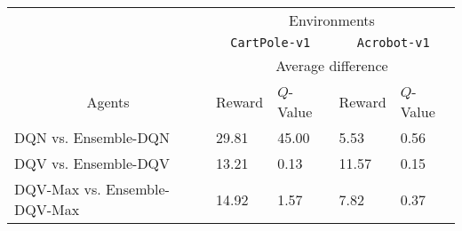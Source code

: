 \documentclass{article}
\begin{document}
\begin{table}[]
\begin{tabular}{@{}c|llll@{}}
\toprule
                                                   & \multicolumn{4}{c}{Environments}                                                                                                                                                         \\
                                                   & \multicolumn{2}{c}{\texttt{CartPole-v1}}                                        & \multicolumn{2}{c}{\texttt{Acrobot-v1}}                                                                \\ \cmidrule(l){2-5}
                                                   & \multicolumn{4}{c}{Average difference}                                                                                                                                                   \\
\multirow{-4}{*}{Agents}                           & Reward                     & $Q$-Value                                          & Reward                                             & $Q$-Value                                         \\ \midrule
\multicolumn{1}{|l|}{DQN vs. Ensemble-DQN}         & \multicolumn{1}{l|}{29.81} & \multicolumn{1}{l|}{\cellcolor[HTML]{FFFC9E}45.00} & \multicolumn{1}{l|}{\cellcolor[HTML]{FFFC9E}5.53}  & \multicolumn{1}{l|}{\cellcolor[HTML]{FFFC9E}0.56} \\ \midrule
\multicolumn{1}{|l|}{DQV vs. Ensemble-DQV}         & \multicolumn{1}{l|}{13.21} & \multicolumn{1}{l|}{0.13}                          & \multicolumn{1}{l|}{\cellcolor[HTML]{FFFC9E}11.57} & \multicolumn{1}{l|}{\cellcolor[HTML]{FFFC9E}0.15} \\ \midrule
\multicolumn{1}{|l|}{DQV-Max vs. Ensemble-DQV-Max} & \multicolumn{1}{l|}{14.92} & \multicolumn{1}{l|}{1.57}                          & \multicolumn{1}{l|}{\cellcolor[HTML]{FFFC9E}7.82}  & \multicolumn{1}{l|}{\cellcolor[HTML]{FFFC9E}0.37} \\ \bottomrule
\end{tabular}
\caption{}
\label{tab:my-table-5}
\end{table}

\newpage
\end{document}
